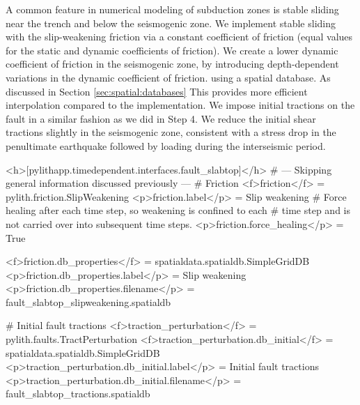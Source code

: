 A common feature in numerical modeling of subduction zones is stable
sliding near the trench and below the seismogenic zone. We implement
stable sliding with the slip-weakening friction via a constant
coefficient of friction (equal values for the static and dynamic
coefficients of friction). We create a lower dynamic coefficient of
friction in the seismogenic zone, by introducing depth-dependent
variations in the dynamic coefficient of friction. using a
 spatial database. As discussed in Section
\vref{sec:spatial:databases} This provides more efficient
interpolation compared to the  implementation.
We impose initial tractions on the fault in a similar fashion as we
did in Step 4. We reduce the initial shear tractions slightly in the
seismogenic zone, consistent with a stress drop in the penultimate
earthquake followed by loading during the interseismic period.
\begin{cfg}
<h>[pylithapp.timedependent.interfaces.fault_slabtop]</h>
# --- Skipping general information discussed previously ---
# Friction
<f>friction</f> = pylith.friction.SlipWeakening
<p>friction.label</p> = Slip weakening
# Force healing after each time step, so weakening is confined to each
# time step and is not carried over into subsequent time steps.
<p>friction.force_healing</p> = True

<f>friction.db_properties</f> = spatialdata.spatialdb.SimpleGridDB
<p>friction.db_properties.label</p> = Slip weakening
<p>friction.db_properties.filename</p> = fault_slabtop_slipweakening.spatialdb

# Initial fault tractions
<f>traction_perturbation</f> = pylith.faults.TractPerturbation
<f>traction_perturbation.db_initial</f> = spatialdata.spatialdb.SimpleGridDB
<p>traction_perturbation.db_initial.label</p> = Initial fault tractions
<p>traction_perturbation.db_initial.filename</p> = fault_slabtop_tractions.spatialdb
\end{cfg}

